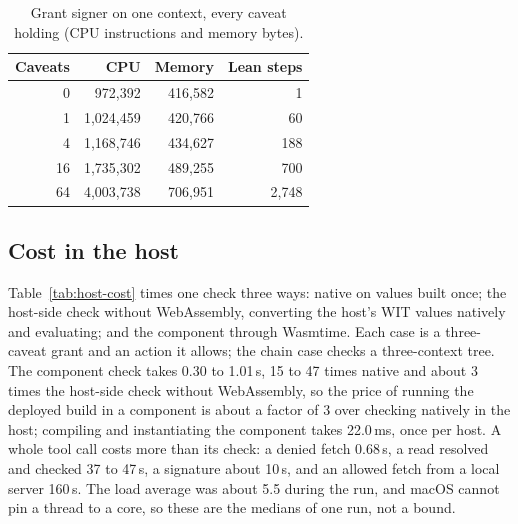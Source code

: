 \begin{table}[t]
\caption{Grant signer  on one context, every caveat
holding (CPU instructions and memory bytes).}\label{tab:signer-cost}
\small
\begin{tabular}{@{}rrrr@{}}
\toprule
\textbf{Caveats} & \textbf{CPU} & \textbf{Memory} & \textbf{Lean steps} \\
\midrule
0 & 972{,}392 & 416{,}582 & 1 \\
1 & 1{,}024{,}459 & 420{,}766 & 60 \\
4 & 1{,}168{,}746 & 434{,}627 & 188 \\
16 & 1{,}735{,}302 & 489{,}255 & 700 \\
64 & 4{,}003{,}738 & 706{,}951 & 2{,}748 \\
\bottomrule
\end{tabular}
\end{table}

\subsection{Cost in the host}

Table~\ref{tab:host-cost} times one check three ways: native
 on values built once; the host-side check without
WebAssembly, converting the host's WIT values natively and evaluating; and
the component through Wasmtime. Each case is a three-caveat grant and an
action it allows; the chain case checks a three-context tree. The component
check takes 0.30 to 1.01\,\textmu s, 15 to 47 times native and about 3 times
the host-side check without WebAssembly, so the price of running the deployed
build in a component is about a factor of 3 over checking natively in the
host; compiling and instantiating the component takes 22.0\,ms, once per
host. A whole tool call costs more than its check: a
denied fetch 0.68\,\textmu s, a read resolved and checked 37 to
47\,\textmu s, a signature about 10\,\textmu s, and an allowed fetch from a
local server 160\,\textmu s. The load average was
about 5.5 during the run, and macOS cannot pin a thread to a core, so these
are the medians of one run, not a bound.

